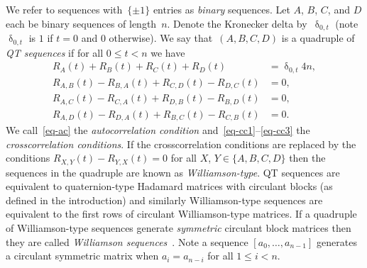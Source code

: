 \documentclass[12pt]{article}
\numberwithin{equation}{section}
\newcommand{\eq}{=}
\newcommand{\diracdelta}{\updelta}
\begin{document}
We refer to sequences with~$\{\pm1\}$ entries as \emph{binary\/} sequences.
Let $A$, $B$, $C$, and $D$ each be binary sequences of length~$n$.
Denote the Kronecker delta by~$\diracdelta_{0,t}$ (note $\diracdelta_{0,t}$ is $1$ if $t=0$ and $0$ otherwise).
We say that~$(A,B,C,D)$ is a quadruple of \emph{QT sequences} if for all $0\leq t < n$ we have
\begin{align}
\label{eq-ac}
R_{A}(t)+R_B(t)+R_C(t)+R_D(t) & \eq \diracdelta_{0,t} 4n , \\
\label{eq-cc1}
R_{A,B}(t)-R_{B,A}(t) + R_{C,D}(t)-R_{D,C}(t) & \eq 0 , \\
\label{eq-cc2}
R_{A,C}(t)-R_{C,A}(t) + R_{D,B}(t)-R_{B,D}(t) & \eq 0 , \\
\label{eq-cc3}
R_{A,D}(t)-R_{D,A}(t) + R_{B,C}(t)-R_{C,B}(t) & \eq 0.
\end{align}
We call~\eqref{eq-ac} the \emph{autocorrelation condition} and~\eqref{eq-cc1}--\eqref{eq-cc3} the \emph{crosscorrelation conditions}.
If the crosscorrelation conditions are replaced by the conditions
$R_{X,Y}(t)-R_{Y,X}(t)=0$ for all $X$, $Y\in\{A,B,C,D\}$
then the sequences in the quadruple are known as \emph{Williamson-type}.
QT sequences are equivalent to
quaternion-type Hadamard matrices with circulant blocks (as defined in the introduction)
and similarly Williamson-type sequences are equivalent to the first rows of
circulant Williamson-type matrices.
If a quadruple of Williamson-type sequences generate \emph{symmetric} circulant
block matrices then they are called \emph{Williamson sequences}~\cite{BKG20-williamson-conjecture}.
Note a sequence $[a_0,\dotsc,a_{n-1}]$ generates a circulant symmetric matrix when
$a_i=a_{n-i}$ for all $1\leq i<n$.
\end{document}
